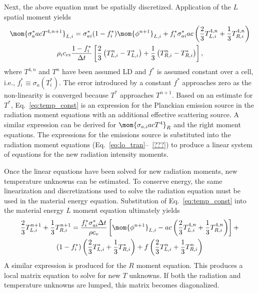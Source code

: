 Next, the above equation must be spatially discretized.  Application of the $L$ spatial
moment yields
\begin{multline}\label{eq:temp_const}
    \mom{\sigma_a^* a c T^{4,n+1}}_{L,i} = \sigma^*_{ai}(1-f_i^*)\mom{\phi^{n+1}}_{L,i} +
    f_i^*
    \sigma^*_{ai} a c \left(\frac{2}{3} T_{L,i}^{4,n} + \frac{1}{3} T_{R,i}^{4,n}\right)
    \\ \rho_i c_{vi} \frac{1 - f^*_i}{\Delta t} \left[\frac{2}{3}\left(T^n_{L,i} -
        T^*_{L,i}\right) + \frac{1}{3}\left(T^n_{R,i} -
    T^*_{R,i}\right)\right],
\end{multline}
where $T^{4,n}$ and $T^{n}$ have been assumed LD and $f^*$ is assumed constant over a cell, i.e., $f^*_i
\equiv \sigma_a(T_i^*)$.
The error introduced by a constant $f^*$ approaches zero as the
non-linearity is converged because $T^*$ approaches $T^{n+1}$. 
Based on an estimate for $T^*$, Eq.~\eqref{eq:temp_const} is an expression for
the Planckian emission source in the radiation moment equations with an additional effective scattering source.
A similar expression can be derived for $\mom{\sigma_{a,i} a c T^4}_R$ and the right
moment equations.
The expressions for the emissions source is substituted into the radiation moment equations
(Eq.~\eqref{eq:lo_tran}--~\eqref{???}) to produce a
linear system of equations for the new radiation intensity moments. 

Once the linear equations have been solved for new radiation moments, new temperature
unknowns can be estimated.  To conserve energy, the same linearization and discretizations used to
solve the radiation equation must be used in the material energy equation.
Substitution of Eq.~\eqref{eq:temp_const} into the material energy $L$ moment equation
ultimately yields
\begin{multline}\label{eq:new_temp}
    \frac{2}{3}T_{L,i}^{n+1} + \frac{1}{3}T_{R,i}^{n+1}= \frac{f_i^* \sigma_{ai}^* \Delta
t}{\rho c_{v}}  \left[ \mom{\phi^{n+1}}_{L,i}  - a c\left(\frac{2}{3} T_{L,i}^{4,n} + \frac{1}{3} T_{R,i}^{4,n}\right)
\right] + \\ (1- f^*_{i})\left(\frac{2}{3}T^*_{L,i} + \frac{1}{3}T^*_{R,i}\right) + f
\left(\frac{2}{3}T^n_{L,i} + \frac{1}{3}T^n_{R,i}\right)
\end{multline}
A similar expression is produced for the $R$ moment equation.  This produces a local
matrix equation to solve for new $T$ unknowns.  If both the radiation and temperature unknowns
are lumped, this matrix becomes diagonalized.


